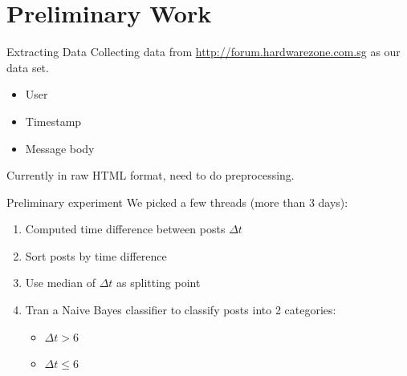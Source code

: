 \documentclass[compress]{beamer}
\begin{document}
\section{Preliminary Work}
\begin{frame}{Extracting Data}
	Collecting data from \url{http://forum.hardwarezone.com.sg} as our data set.
	\begin{itemize}
		\item User
		\item Timestamp
		\item Message body
	\end{itemize}
	
	Currently in raw HTML format, need to do preprocessing.

\end{frame}


\begin{frame}{Preliminary experiment}
We picked a few threads (more than 3 days):
\begin{enumerate}
	\item Computed time difference between posts $\Delta t$
	\item Sort posts by time difference
	\item Use median of $\Delta t$ as splitting point
	\item Tran a Naive Bayes classifier to classify posts into 2 categories:
	\begin{itemize}
		\item $\Delta t > 6$
		\item $\Delta t \leq 6$
	\end{itemize}
\end{enumerate}
\end{frame}
\end{document}
